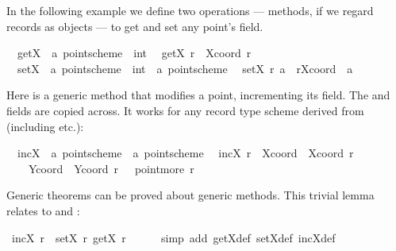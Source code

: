 \begin{isabellebody}
\begin{isamarkuptext}
  In the following example we define two operations --- methods, if we
  regard records as objects --- to get and set any point's  field.%
\end{isamarkuptext}%
\isamarkuptrue%
\isanewline
\ \ getX\ {\isacharcolon}{\isacharcolon}\ {\isachardoublequote}{\isacharprime}a\ point{\isacharunderscore}scheme\ {\isasymRightarrow}\ int{\isachardoublequote}\isanewline
\ \ {\isachardoublequote}getX\ r\ {\isasymequiv}\ Xcoord\ r{\isachardoublequote}\isanewline
\ \ setX\ {\isacharcolon}{\isacharcolon}\ {\isachardoublequote}{\isacharprime}a\ point{\isacharunderscore}scheme\ {\isasymRightarrow}\ int\ {\isasymRightarrow}\ {\isacharprime}a\ point{\isacharunderscore}scheme{\isachardoublequote}\isanewline
\ \ {\isachardoublequote}setX\ r\ a\ {\isasymequiv}\ r{\isasymlparr}Xcoord\ {\isacharcolon}{\isacharequal}\ a{\isasymrparr}{\isachardoublequote}\isamarkupfalse%
%
\begin{isamarkuptext}%
Here is a generic method that modifies a point, incrementing its
   field.  The  and  fields
  are copied across.  It works for any record type scheme derived from
   (including  etc.):%
\end{isamarkuptext}%
\isamarkuptrue%
\isanewline
\ \ incX\ {\isacharcolon}{\isacharcolon}\ {\isachardoublequote}{\isacharprime}a\ point{\isacharunderscore}scheme\ {\isasymRightarrow}\ {\isacharprime}a\ point{\isacharunderscore}scheme{\isachardoublequote}\isanewline
\ \ {\isachardoublequote}incX\ r\ {\isasymequiv}\ {\isasymlparr}Xcoord\ {\isacharequal}\ Xcoord\ r\ {\isacharplus}\ {}{\isacharcomma}\isanewline
\ \ \ \ Ycoord\ {\isacharequal}\ Ycoord\ r{\isacharcomma}\ {\isasymdots}\ {\isacharequal}\ point{\isachardot}more\ r{\isasymrparr}{\isachardoublequote}\isamarkupfalse%
%
\begin{isamarkuptext}%
Generic theorems can be proved about generic methods.  This trivial
  lemma relates  to  and :%
\end{isamarkuptext}%
\isamarkuptrue%
\ {\isachardoublequote}incX\ r\ {\isacharequal}\ setX\ r\ {\isacharparenleft}getX\ r\ {\isacharplus}\ {}{\isacharparenright}{\isachardoublequote}\isanewline
\ \ \isamarkupfalse%
\ {\isacharparenleft}simp\ add{\isacharcolon}\ getX{\isacharunderscore}def\ setX{\isacharunderscore}def\ incX{\isacharunderscore}def{\isacharparenright}\isamarkupfalse%
%
\begin{isamarkuptext}%

\end{isamarkuptext}
\end{isabellebody}
